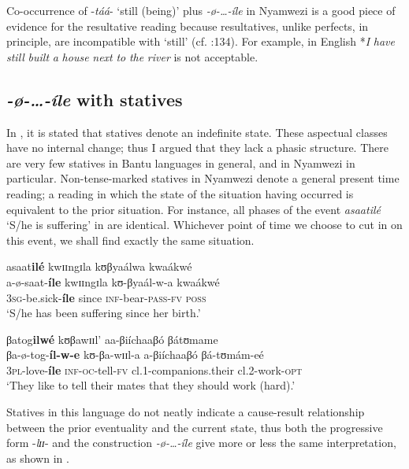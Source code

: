 \documentclass[output=paper]{langscibook}
\begin{document}
Co-occurrence of -\textit{táá}- ‘still (being)’ plus \textit{-ø}\textit{-\ldots-íle} in Nyamwezi is a good piece of evidence for the resultative reading because resultatives, unlike perfects, in principle, are incompatible with ‘still’ (cf. \citealt{Dahl1985}:134). For example, in English *\textit{I} \textit{have} \textit{still} \textit{built} \textit{a} \textit{house} \textit{next} \textit{to} \textit{the} \textit{river} is not acceptable.  

 \subsection{\textit{-}\textit{ø-…-íle} with statives}
 

In , it is stated that statives denote an indefinite state. These aspectual classes have no internal change; thus I argued that they lack a phasic structure. There are very few statives in Bantu languages in general, and in Nyamwezi in particular. Non-tense-marked statives in Nyamwezi denote a general present time reading; a reading in which the state of the situation having occurred is equivalent to the prior situation. For instance, all phases of the event \textit{asaatilé} ‘S/he is suffering’ in  are identical. Whichever point of time we choose to cut in on this event, we shall find exactly the same situation. 

\ea \label{ex:kanijo:18}
\ea 
    \glll asaat\textbf{ilé}  kwɪɪngɪla  kʊβyaálwa  kwaákwé\\
    a-ø-saat-\textbf{íle}       kwɪɪngɪla kʊ-βyaál-w-a       kwaákwé\\
    3\textsc{sg}-be.sick-\textbf{íle} since \textsc{inf}-bear-\textsc{pass}-\textsc{fv} \textsc{poss}\\
    \glt ‘S/he has been suffering since her birth.’

\ex 
    \glll   βatog\textbf{ilwé}          kʊβawɪɪl’       aa-βiíchaaβó    βátʊmame\\       
            βa-ø-tog-\textbf{íl-w-e}    kʊ-βa-wɪɪl-a    a-βiíchaaβó     βá-tʊmám-eé\\          
    3\textsc{pl}-love-\textbf{íle}       \textsc{inf}-\textsc{oc}-tell-\textsc{fv} cl.1-companions.their    cl.2-work-\textsc{opt}\\
  \glt ‘They like to tell their mates that they should work (hard).’
\z
\z

Statives in this language do not neatly indicate a cause-result relationship between the prior eventuality and the current state, thus both the progressive form -\textit{lɪɪ}- and the construction \textit{-ø}\textit{-…-íle} give more or less the same interpretation, as shown in . 
\end{document}
